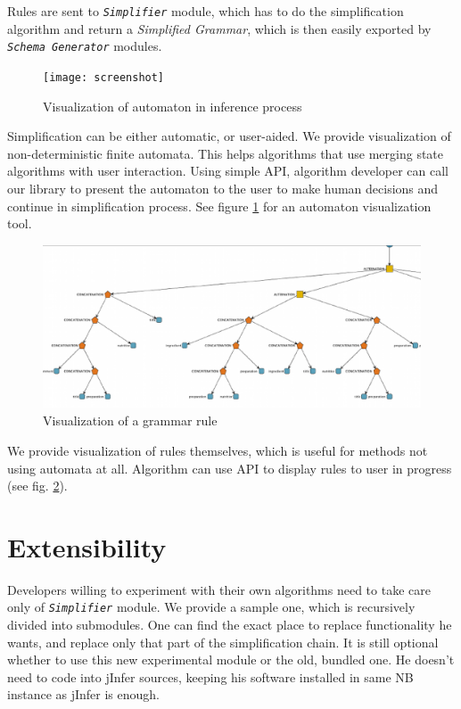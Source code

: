 \documentclass[a4paper,8pt,oneside,twocolumn]{article}
\newcommand{\myscale}{0.9}
\newcommand{\jmodule}[1]{\texttt{\textit{#1}}}
\begin{document}
Rules are sent to \jmodule{Simplifier} module, which has to do the simplification algorithm and return a \emph{Simplified Grammar}, which is then easily exported by \jmodule{Schema Generator} modules.

\begin{figure}
	\centering\texttt{[image: screenshot]}
	\caption{Visualization of automaton in inference process} \label{screenshot}
\end{figure}
Simplification can be either automatic, or user-aided.
We provide visualization of non-deterministic finite automata.
This helps algorithms that use merging state algorithms with user interaction.
Using simple API, algorithm developer can call our library to present the automaton to the user to make human decisions and continue in simplification process.
See figure \ref{screenshot} for an automaton visualization tool.

\begin{figure}
	\centering\includegraphics[width=\myscale\columnwidth]{ruledisplayer}
	\caption{Visualization of a grammar rule} \label{ruledisplayer}
\end{figure}
We provide visualization of rules themselves, which is useful for methods not using automata at all.
Algorithm can use API to display rules to user in progress (see fig. \ref{ruledisplayer}).

\section*{Extensibility}
Developers willing to experiment with their own algorithms need to take care only of \jmodule{Simplifier} module.
We provide a sample one, which is recursively divided into submodules.
One can find the exact place to replace functionality he wants, and replace only that part of the simplification chain.
It is still optional whether to use this new experimental module or the old, bundled one.
He doesn't need to code into jInfer sources, keeping his software installed in same NB instance as jInfer is enough. %
\end{document}
